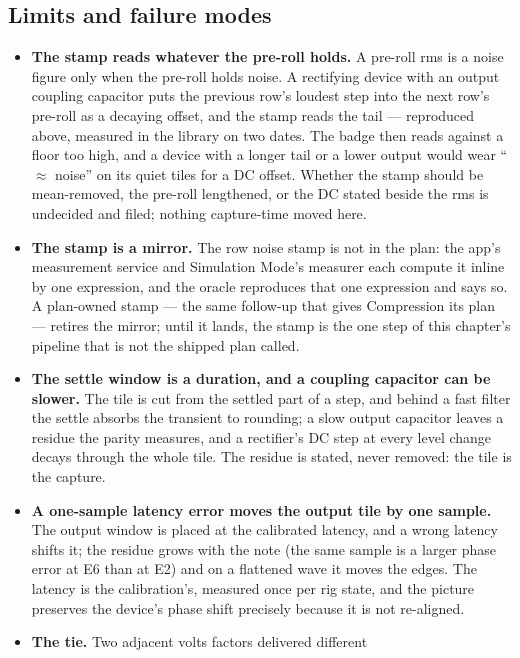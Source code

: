 \documentclass[11pt,a4paper]{article}
\begin{document}
\subsection{Limits and failure modes}
\label{sec:matrix-limits}
{\sloppy
\begin{itemize}
  \item \textbf{The stamp reads whatever the pre-roll holds.} A pre-roll
  rms is a noise figure only when the pre-roll holds noise. A rectifying
  device with an output coupling capacitor puts the previous row's
  loudest step into the next row's pre-roll as a decaying offset, and
  the stamp reads the tail --- reproduced above, measured in the library
  on two dates. The badge then reads against a floor too high, and a
  device with a longer tail or a lower output would wear ``$\approx$
  noise'' on its quiet tiles for a DC offset. Whether the stamp should be
  mean-removed, the pre-roll lengthened, or the DC stated beside the rms
  is undecided and filed; nothing capture-time moved here.
  \item \textbf{The stamp is a mirror.} The row noise stamp is not in the
  plan: the app's measurement service and Simulation Mode's measurer
  each compute it inline by one expression, and the oracle reproduces
  that one expression and says so. A plan-owned stamp --- the same
  follow-up that gives Compression its plan --- retires the mirror; until
  it lands, the stamp is the one step of this chapter's pipeline that is
  not the shipped plan called.
  \item \textbf{The settle window is a duration, and a coupling capacitor
  can be slower.} The tile is cut from the settled part of a step, and
  behind a fast filter the settle absorbs the transient to rounding; a
  slow output capacitor leaves a residue the parity measures, and a
  rectifier's DC step at every level change decays through the whole
  tile. The residue is stated, never removed: the tile is the capture.
  \item \textbf{A one-sample latency error moves the output tile by one
  sample.} The output window is placed at the calibrated latency, and a
  wrong latency shifts it; the residue grows with the note (the same
  sample is a larger phase error at E6 than at E2) and on a flattened
  wave it moves the edges. The latency is the calibration's, measured
  once per rig state, and the picture preserves the device's phase shift
  precisely because it is not re-aligned.
  \item \textbf{The tie.} Two adjacent volts factors delivered different

\end{itemize}}
\end{document}
